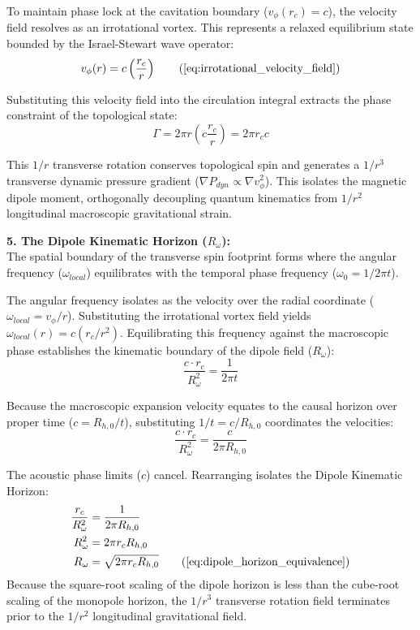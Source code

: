 To maintain phase lock at the cavitation boundary ($v_\phi(r_c) = c$), the velocity field resolves as an irrotational vortex. This represents a relaxed equilibrium state bounded by the Israel-Stewart wave operator: 
\begin{equation}
    v_\phi(r) = c \left( \frac{r_c}{r} \right) \tag{\ref{eq:irrotational_velocity_field}}
\end{equation}

Substituting this velocity field into the circulation integral extracts the phase constraint of the topological state:
\begin{equation}
    \Gamma = 2\pi r \left( c \frac{r_c}{r} \right) = 2\pi r_c c \label{eq:kelvin_phase_constraint}
\end{equation}

This $1/r$ transverse rotation conserves topological spin and generates a $1/r^3$ transverse dynamic pressure gradient ($\nabla P_{dyn} \propto \nabla v_\phi^2$). This isolates the magnetic dipole moment, orthogonally decoupling quantum kinematics from $1/r^2$ longitudinal macroscopic gravitational strain. 

\vspace{0.2 cm}

\textbf{5. The Dipole Kinematic Horizon ($R_\omega$):} \\
The spatial boundary of the transverse spin footprint forms where the angular frequency ($\omega_{local}$) equilibrates with the temporal phase frequency ($\omega_0 = 1/2\pi t$). 

The angular frequency isolates as the velocity over the radial coordinate ($\omega_{local} = v_\phi / r$). Substituting the irrotational vortex field yields $\omega_{local}(r) = c(r_c/r^2)$. Equilibrating this frequency against the macroscopic phase establishes the kinematic boundary of the dipole field ($R_\omega$): 
\begin{equation}
    \frac{c \cdot r_c}{R_\omega^2} = \frac{1}{2\pi t}
\end{equation}

Because the macroscopic expansion velocity equates to the causal horizon over proper time ($c = R_{h,0}/t$), substituting $1/t = c/R_{h,0}$ coordinates the velocities:
\begin{equation}
    \frac{c \cdot r_c}{R_\omega^2} = \frac{c}{2\pi R_{h,0}}
\end{equation}

The acoustic phase limits ($c$) cancel. Rearranging isolates the Dipole Kinematic Horizon:
\begin{align}
    \frac{r_c}{R_\omega^2} &= \frac{1}{2\pi R_{h,0}} \nonumber \\
    R_\omega^2 &= 2\pi r_c R_{h,0} \nonumber \\
    R_\omega &= \sqrt{2\pi r_c R_{h,0}} \tag{\ref{eq:dipole_horizon_equivalence}}
\end{align}
Because the square-root scaling of the dipole horizon is less than the cube-root scaling of the monopole horizon, the $1/r^3$ transverse rotation field terminates prior to the $1/r^2$ longitudinal gravitational field. 

